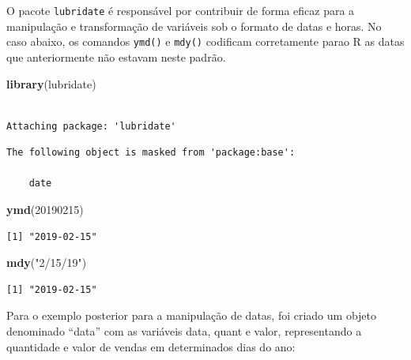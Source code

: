 \documentclass[12pt,brazil,oneside]{book}
\newenvironment{Shaded}{\begin{snugshade}}{\end{snugshade}}
\newcommand{\DecValTok}[1]{\textcolor[rgb]{0.00,0.00,0.81}{#1}}
\newcommand{\KeywordTok}[1]{\textcolor[rgb]{0.13,0.29,0.53}{\textbf{#1}}}
\newcommand{\NormalTok}[1]{#1}
\newcommand{\StringTok}[1]{\textcolor[rgb]{0.31,0.60,0.02}{#1}}
\begin{document}
O pacote \texttt{lubridate} é responsável por contribuir de forma eficaz para a manipulação e transformação de variáveis sob o formato de datas e horas. No caso abaixo, os comandos \texttt{ymd()} e \texttt{mdy()} codificam corretamente parao R as datas que anteriormente não estavam neste padrão.

\begin{Shaded}
\begin{Highlighting}[]
\KeywordTok{library}\NormalTok{(lubridate)}
\end{Highlighting}
\end{Shaded}

\begin{verbatim}

Attaching package: 'lubridate'
\end{verbatim}

\begin{verbatim}
The following object is masked from 'package:base':

    date
\end{verbatim}

\begin{Shaded}
\begin{Highlighting}[]
\KeywordTok{ymd}\NormalTok{(}\DecValTok{20190215}\NormalTok{)}
\end{Highlighting}
\end{Shaded}

\begin{verbatim}
[1] "2019-02-15"
\end{verbatim}

\begin{Shaded}
\begin{Highlighting}[]
\KeywordTok{mdy}\NormalTok{(}\StringTok{"2/15/19"}\NormalTok{)}
\end{Highlighting}
\end{Shaded}

\begin{verbatim}
[1] "2019-02-15"
\end{verbatim}

Para o exemplo posterior para a manipulação de datas, foi criado um objeto denominado ``data'' com as variáveis data, quant e valor, representando a quantidade e valor de vendas em determinados dias do ano:
\end{document}
